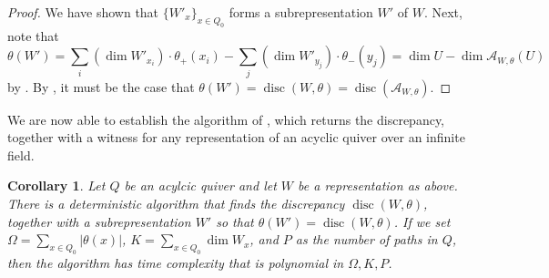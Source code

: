 \documentclass[a4paper]{amsart}
\numberwithin{equation}{section}
\theoremstyle{plain}
\newtheorem{corollary}[theorem]{Corollary}
\theoremstyle{definition}
\DeclareMathOperator{\disc}{disc}
\begin{document}
\begin{proof}
We have shown that $\{W'_{x}\}_{x\in Q_0}$ forms a subrepresentation $W'$ of $W$. Next, note that $$\theta(W')=\sum_{i}(\dim W'_{x_i})\cdot \theta_{+}(x_i)-\sum_{j}(\dim W'_{y_j})\cdot \theta_{-}(y_j)=\dim U -\dim \mathcal{A}_{W,\theta}(U)$$ by . By , it must be the case that $\theta(W')=\disc(W,\theta)=\disc(\mathcal{A}_{W,\theta}).$
\end{proof}

We are now able to establish the algorithm of , which returns the discrepancy, together with a witness for any representation of an acyclic quiver over an infinite field. 

\begin{corollary}\label{proposition3.5_hus}
Let $Q$ be an acylcic quiver and let $W$ be a representation as above. There is a deterministic algorithm that finds the discrepancy $\disc(W,\theta)$, together with a subrepresentation $W'$ so that $\theta(W')=\disc(W,\theta)$. If we set  $\Omega=\sum_{x\in Q_0}|\theta(x)|$, $K=\sum_{x\in Q_0}\dim W_{x}$, and $P$ as the number of paths in $Q$, then the algorithm has time complexity that is polynomial in $\Omega,K,P$. 
\end{corollary}
\end{document}
